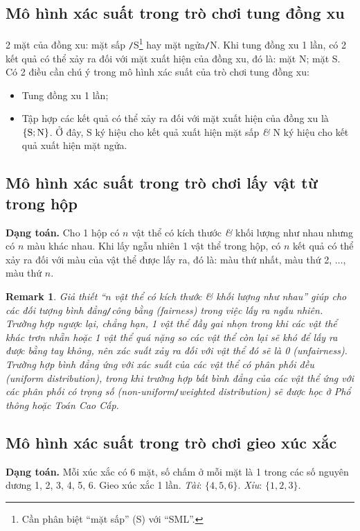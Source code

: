 \documentclass[oneside]{book}
\numberwithin{equation}{section}
\newtheorem{remark}{Remark}[section]
\begin{document}
\subsection{Mô hình xác suất trong trò chơi tung đồng xu}
2 mặt của đồng xu: mặt sấp \texttt{/}S\footnote{Cần phân biệt ``mặt sấp'' (S) với ``SML''.} hay mặt ngửa\texttt{/}N. Khi tung đồng xu 1 lần, có 2 kết quả có thể xảy ra đối với mặt xuất hiện của đồng xu, đó là: mặt N; mặt S. Có 2 điều cần chú ý trong mô hình xác suất của trò chơi tung đồng xu:
\begin{itemize}
	\item Tung đồng xu 1 lần;
	\item Tập hợp các kết quả có thể xảy ra đối với mặt xuất hiện của đồng xu là $\{\rm S;N\}$. Ở đây, S ký hiệu cho kết quả xuất hiện mặt sấp \textit{\&} N ký hiệu cho kết quả xuất hiện mặt ngửa.
\end{itemize}

\subsection{Mô hình xác suất trong trò chơi lấy vật từ trong hộp}
\textbf{Dạng toán.} Cho 1 hộp có $n$ vật thể có kích thước \textit{\&} khối lượng như nhau nhưng có $n$ màu khác nhau. Khi lấy ngẫu nhiên 1 vật thể trong hộp, có $n$ kết quả có thể xảy ra đối với màu của vật thể được lấy ra, đó là: màu thứ nhất, màu thứ 2, $\ldots$, màu thứ $n$.

\begin{remark}
	Giả thiết ``$n$ vật thể có kích thước \textit{\&} khối lượng như nhau'' giúp cho các đối tượng bình đẳng\emph{\texttt{/}}công bằng (fairness) trong việc lấy ra ngẫu nhiên. Trường hợp ngược lại, chẳng hạn, 1 vật thể đầy gai nhọn trong khi các vật thể khác trơn nhẵn hoặc 1 vật thể quá nặng so các vật thể còn lại sẽ khó để lấy ra được bằng tay không, nên xác suất xảy ra đối với vật thể đó sẽ là 0 (unfairness). Trường hợp bình đẳng ứng với xác suất của các vật thể có phân phối đều (uniform distribution), trong khi trường hợp bất bình đẳng của các vật thể ứng với các phân phối có trọng số (non-uniform\emph{\texttt{/}}weighted distribution) sẽ được học ở Phổ thông hoặc Toán Cao Cấp.
\end{remark}

\subsection{Mô hình xác suất trong trò chơi gieo xúc xắc}
\textbf{Dạng toán.} Mỗi xúc xắc có 6 mặt, số chấm ở mỗi mặt là 1 trong các số nguyên dương 1, 2, 3, 4, 5, 6. Gieo xúc xắc 1 lần. \textit{Tài}: $\{4,5,6\}$. \textit{Xỉu}: $\{1,2,3\}$.
\end{document}

